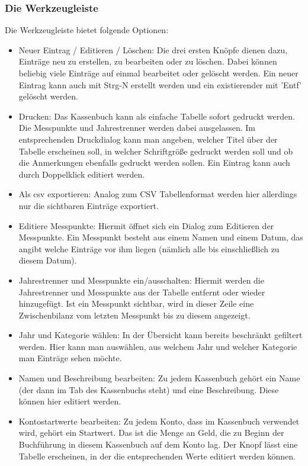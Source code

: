 \documentclass[a4paper,10pt,halfparskip,oneside,smallheadings]{scrbook}
\begin{document}
\subsubsection{Die Werkzeugleiste}
Die Werkzeugleiste bietet folgende Optionen:
\begin{itemize}
 \item Neuer Eintrag / Editieren / Löschen: Die drei ersten Knöpfe dienen dazu, Einträge neu zu erstellen, zu bearbeiten oder zu löschen. Dabei können beliebig viele Einträge auf einmal bearbeitet oder gelöscht werden.
 Ein neuer Eintrag kann auch mit Strg-N erstellt werden und ein existierender mit 'Entf' gelöscht werden.
 \item Drucken: Das Kassenbuch kann als einfache Tabelle sofort gedruckt werden. Die Messpunkte und Jahrestrenner werden dabei ausgelassen. Im entsprechenden Druckdialog kann man angeben, welcher Titel über der Tabelle erscheinen soll, in welcher Schriftgröße gedruckt werden soll und ob die Anmerkungen ebenfalls gedruckt werden sollen. Ein Eintrag kann auch durch Doppelklick editiert werden.
 \item Als csv exportieren: Analog zum CSV Tabellenformat werden hier allerdings nur die sichtbaren Einträge exportiert.
 \item Editiere Messpunkte: Hiermit öffnet sich ein Dialog zum Editieren der Messpunkte. Ein Messpunkt besteht aus einem Namen und einem Datum, das angibt welche Einträge vor ihm liegen (nämlich alle bis einschließlich zu diesem Datum).
 \item Jahrestrenner und Messpunkte ein/ausschalten: Hiermit werden die Jahrestrenner und Messpunkte aus der Tabelle entfernt oder wieder hinzugefügt. Ist ein Messpunkt sichtbar, wird in dieser Zeile eine Zwischenbilanz vom letzten Messpunkt bis zu diesem angezeigt.
 \item Jahr und Kategorie wählen: In der Übersicht kann bereits beschränkt gefiltert werden. Hier kann man auswählen, aus welchem Jahr und welcher Kategorie man Einträge sehen möchte.
 \item Namen und Beschreibung bearbeiten: Zu jedem Kassenbuch gehört ein Name (der dann im Tab des Kassenbuchs steht) und eine Beschreibung. Diese können hier editiert werden.  
 \item Kontostartwerte bearbeiten: Zu jedem Konto, dass im Kassenbuch verwendet wird, gehört ein Startwert. Das ist die Menge an Geld, die zu Beginn der Buchführung in diesem Kassenbuch auf dem Konto lag. Der Knopf lässt eine Tabelle erscheinen, in der die entsprechenden Werte editiert werden können.
\end{itemize}
\end{document}
